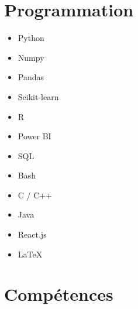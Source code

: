 \documentclass[9pt, oneside, a4paper, titlepage]{extarticle}
\begin{document}
\begin{tcolorbox}
\begin{minipage}[t]{6.2cm}
\begin{spacing}{0.95}
\begin{tcolorbox}[grow to left by = 0.6cm, colback = gray!25, colframe = white]
                \section*{Programmation}
                \vspace*{0.2cm}
                \begin{multicols}{2}
                    \begin{itemize}
                        \item Python 
                        \item Numpy 
                        \item Pandas 
                        \item Scikit-learn
                        \item R
                        \item Power BI
                        \item SQL
                        \item Bash
                        \item C / C++
                        \item Java
                        \item React.js
                        \item \LaTeX
                    \end{itemize}
                    \end{multicols}
                    \vspace*{0.2cm}
                \section*{Compétences}


\end{tcolorbox}
\end{spacing}
\end{minipage}
\end{tcolorbox}
\end{document}
